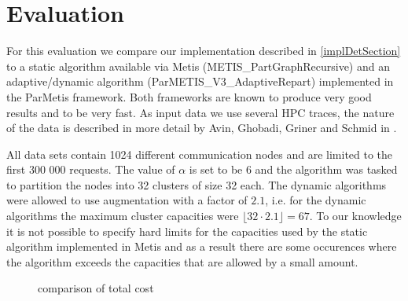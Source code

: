 \documentclass[a4paper,xcolor=dvipsnames, tikz, 12pt]{article}
\newcommand{\nl}{\newline}
\theoremstyle{definition}
\begin{document}
\section{Evaluation}


For this evaluation we compare our implementation described in \cref{implDetSection} to a static algorithm available via Metis (METIS\_PartGraphRecursive) and an adaptive/dynamic algorithm (ParMETIS\_V3\_AdaptiveRepart) implemented in the ParMetis framework. Both frameworks are known to produce very good results and to be very fast.\nl
As input data we use several HPC traces, the nature of the data is described in more detail by Avin, Ghobadi, Griner and Schmid in \cite{Avin2019}.

All data sets contain 1024 different communication nodes and are limited to the first 300 000 requests. The value of $\alpha$ is set to be 6 and the algorithm was tasked to partition the nodes into 32 clusters of size 32 each. The dynamic algorithms were allowed to use augmentation with a factor of $2.1$, i.e. for the dynamic algorithms the maximum cluster capacities were $\lfloor32\cdot2.1\rfloor=67$.\nl
To our knowledge it is not possible to specify hard limits for the capacities used by the static algorithm implemented in Metis and as a result there are some occurences where the algorithm exceeds the capacities that are allowed by a small amount.\nl\nl

\begin{figure}
	\caption{comparison of total cost}\label{totalCostPlot}
\end{figure}
\end{document}
